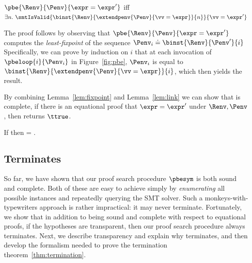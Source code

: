 \begin{lemma}\label{lem:fixpoint}
$\pbe{\Renv}{\Penv}{\expr = \expr'}$ iff
$\exists n.\ \smtIsValid{\binst{\Renv}{\extendpenv{\Penv}{\vv = \expr}}{n}}{\vv = \expr'}$
\end{lemma}

The proof follows by observing that
$\pbe{\Renv}{\Penv}{\expr = \expr'}$
computes the \emph{least-fixpoint}
of the sequence
%
$\Penv_i \doteq \binst{\Renv}{\Penv'}{i} \label{eq:fix:1}$
%
Specifically, we can prove by induction on $i$
that at each invocation of $\pbeloop{i}{\Penv_i}$
in Figure~\ref{fig:pbe}, $\Penv_i$ is equal to
$\binst{\Renv}{\extendpenv{\Penv}{\vv = \expr}}{i}$,
which then yields the result.

%
By combining Lemma~\ref{lem:fixpoint}
and  Lemma~\ref{lem:link}  we can show that
\pbesym is complete, \ie if there is an equational proof
that $\expr = \expr'$ under $\Renv, \Penv$,
then  returns $\ttrue$.

\begin{theorem} \label{thm:completeness}
  If 
  then  = \ttrue.
\end{theorem}

\subsection{\pbesym Terminates} \label{sec:pbe:terminates}

So far, we have shown that our proof search
procedure $\pbesym$ is both sound and complete.
%
Both of these are easy to achieve
simply by \emph{enumerating} all
possible instances and repeatedly
querying the SMT solver.
%
Such a monkeys-with-typewriters
approach is rather impractical: it
may never terminate.
%
Fortunately, we show that in
addition to being sound and complete
with respect to equational proofs,
if the hypotheses are transparent,
then our proof search procedure always
terminates.
%
Next, we describe transparency and
explain why \pbesym terminates, and
then develop the formalism needed
to prove the termination
theorem~\ref{thm:termination}.

